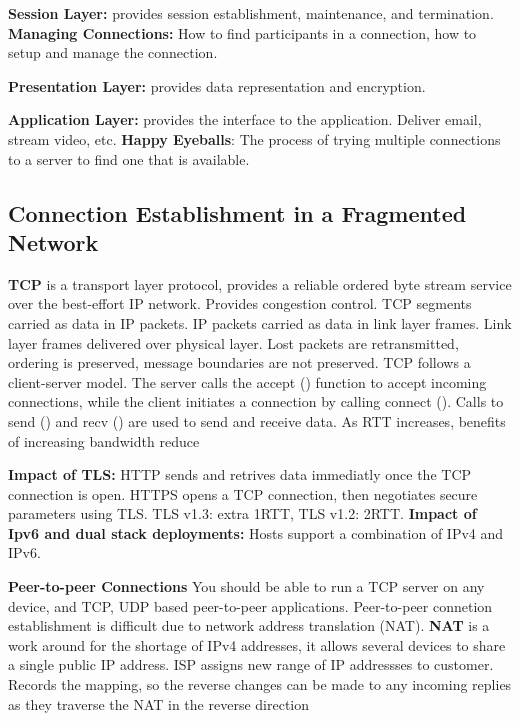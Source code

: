 \documentclass{article}
\begin{document}
\noindent \textbf{Session Layer:} provides session establishment, maintenance, and termination.
\textbf{Managing Connections:} How to find participants in a connection, how to setup and manage the connection.

\noindent \textbf{Presentation Layer:} provides data representation and encryption.

\noindent \textbf{Application Layer:} provides the interface to the application. Deliver email, stream video, etc.
\textbf{Happy Eyeballs}: The process of trying multiple connections to a server to find one that is available.


\subsection*{Connection Establishment in a Fragmented Network}

\noindent \textbf{TCP} is a transport layer protocol, provides a reliable ordered byte stream service over the
best-effort IP network. Provides congestion control.
TCP segments carried as data in IP packets.
IP packets carried as data in link layer frames. Link layer frames delivered over physical layer.
Lost packets are retransmitted, ordering is preserved, message boundaries are not preserved.
TCP follows a client-server model.
The server calls the accept () function to accept incoming connections, while the client initiates a connection by calling connect ().
Calls to send () and recv () are used to send and receive data.
As RTT increases, benefits of increasing bandwidth reduce

\noindent \textbf{Impact of TLS:}
HTTP sends and retrives data immediatly once the TCP connection is open.
HTTPS opens a TCP connection, then negotiates secure parameters using TLS.\@
TLS v1.3: extra 1RTT, TLS v1.2: 2RTT.\@
\noindent \textbf{Impact of Ipv6 and dual stack deployments:}
Hosts support a combination of IPv4 and IPv6.

\noindent \textbf{Peer-to-peer Connections}
You should be able to run a TCP server on any device, and TCP, UDP based peer-to-peer applications.
Peer-to-peer connetion establishment is difficult due to network address translation (NAT).
\textbf{NAT} is a work around for the shortage of IPv4 addresses, it allows several devices to share a single public IP address.
ISP assigns new range of IP addressses to customer.
Records the mapping, so the reverse changes can be made to any incoming replies as they traverse the NAT in the reverse direction
\end{document}
